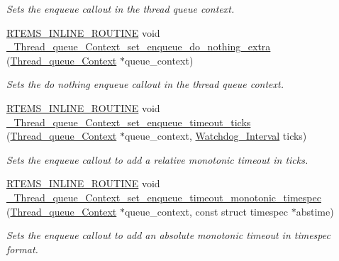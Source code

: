 \begin{DoxyCompactItemize}
\begin{DoxyCompactList}\small\item\em Sets the enqueue callout in the thread queue context. \end{DoxyCompactList}\item 
\mbox{\hyperlink{group__RTEMSScoreBaseDefs_gac216239df231d5dbd15e3520b0b9313f}{R\+T\+E\+M\+S\+\_\+\+I\+N\+L\+I\+N\+E\+\_\+\+R\+O\+U\+T\+I\+NE}} void \mbox{\hyperlink{group__RTEMSScoreThreadQueue_gaa7142c86d5677c5c5b0f993beecdc712}{\+\_\+\+Thread\+\_\+queue\+\_\+\+Context\+\_\+set\+\_\+enqueue\+\_\+do\+\_\+nothing\+\_\+extra}} (\mbox{\hyperlink{structThread__queue__Context}{Thread\+\_\+queue\+\_\+\+Context}} $\ast$queue\+\_\+context)
\begin{DoxyCompactList}\small\item\em Sets the do nothing enqueue callout in the thread queue context. \end{DoxyCompactList}\item 
\mbox{\hyperlink{group__RTEMSScoreBaseDefs_gac216239df231d5dbd15e3520b0b9313f}{R\+T\+E\+M\+S\+\_\+\+I\+N\+L\+I\+N\+E\+\_\+\+R\+O\+U\+T\+I\+NE}} void \mbox{\hyperlink{group__RTEMSScoreThreadQueue_ga539935c21bc9e51bd27d64eb8f2ea26c}{\+\_\+\+Thread\+\_\+queue\+\_\+\+Context\+\_\+set\+\_\+enqueue\+\_\+timeout\+\_\+ticks}} (\mbox{\hyperlink{structThread__queue__Context}{Thread\+\_\+queue\+\_\+\+Context}} $\ast$queue\+\_\+context, \mbox{\hyperlink{group__RTEMSScoreWatchdog_gaa1834fd7531ca9bb5c4ca6fd990388d5}{Watchdog\+\_\+\+Interval}} ticks)
\begin{DoxyCompactList}\small\item\em Sets the enqueue callout to add a relative monotonic timeout in ticks. \end{DoxyCompactList}\item 
\mbox{\hyperlink{group__RTEMSScoreBaseDefs_gac216239df231d5dbd15e3520b0b9313f}{R\+T\+E\+M\+S\+\_\+\+I\+N\+L\+I\+N\+E\+\_\+\+R\+O\+U\+T\+I\+NE}} void \mbox{\hyperlink{group__RTEMSScoreThreadQueue_ga3094c6721a6db2468884cfb502263d36}{\+\_\+\+Thread\+\_\+queue\+\_\+\+Context\+\_\+set\+\_\+enqueue\+\_\+timeout\+\_\+monotonic\+\_\+timespec}} (\mbox{\hyperlink{structThread__queue__Context}{Thread\+\_\+queue\+\_\+\+Context}} $\ast$queue\+\_\+context, const struct timespec $\ast$abstime)
\begin{DoxyCompactList}\small\item\em Sets the enqueue callout to add an absolute monotonic timeout in timespec format. \end{DoxyCompactList}\item 

\end{DoxyCompactItemize}
